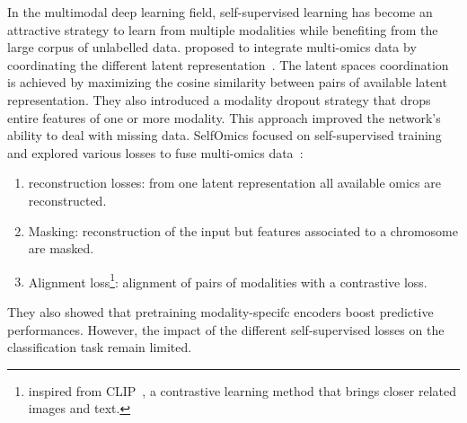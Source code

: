 \documentclass[../main.tex]{subfiles}
\begin{document}
	    In the multimodal deep learning field, self-supervised learning has become an attractive strategy to learn from multiple modalities while benefiting from the large corpus of unlabelled data.
	    \citeauthor{Cheerla2019} proposed to integrate multi-omics data by coordinating the different latent representation~\cite{Cheerla2019}.
	    The latent spaces coordination is achieved by maximizing the cosine similarity between pairs of available latent representation.
	    They also introduced a modality dropout strategy that drops entire features of one or more modality.
	    This approach improved the network’s ability to deal with missing data.
	    SelfOmics focused on self-supervised training and explored various losses to fuse multi-omics data~\cite{selfOmics}:
	    \begin{enumerate}[nosep]
	        \item reconstruction losses: from one latent representation all available omics are reconstructed.
	        \item Masking: reconstruction of the input but features associated to a chromosome are masked.
	        \item Alignment loss\footnote{inspired from CLIP~\cite{CLIPLoss}, a contrastive learning method that brings closer related images and text.}: alignment of pairs of modalities with a contrastive loss.
	    \end{enumerate}
	    They also showed that pretraining modality-specifc encoders boost predictive performances.
	    However, the impact of the different self-supervised losses on the classification task remain limited.
\end{document}
